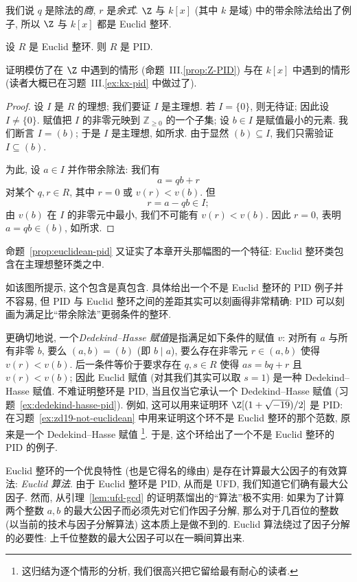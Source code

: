 \noindent 我们说 $q$ 是除法的\emph{商}, $r$ 是\emph{余式}. $\Z$ 与 $k[x]$ (其中 $k$ 是域) 中的带余除法给出了例子, 所以 $\Z$ 与 $k[x]$ 都是 Euclid 整环.

\begin{proposition}\label{prop:euclidean-pid}
设 $R$ 是 Euclid 整环. 则 $R$ 是 PID.
\end{proposition}

\noindent 证明模仿了在 $\Z$ 中遇到的情形 (命题~III.\ref{prop:Z-PID}) 与在 $k[x]$ 中遇到的情形 (读者大概已在习题~III.\ref{ex:kx-pid} 中做过了).

\begin{proof}
设 $I$ 是 $R$ 的理想; 我们要证 $I$ 是主理想. 若 $I=\{0\}$, 则无待证; 因此设 $I\neq\{0\}$. 赋值把 $I$ 的非零元映到 $\mathbb{Z}_{\ge 0}$ 的一个子集; 设 $b\in I$ 是赋值最小的元素. 我们断言 $I=(b)$; 于是 $I$ 是主理想, 如所求. 由于显然 $(b)\subseteq I$, 我们只需验证 $I\subseteq (b)$.

\noindent 为此, 设 $a\in I$ 并作带余除法: 我们有
\[
a = qb + r
\]
对某个 $q,r\in R$, 其中 $r=0$ 或 $v(r)<v(b)$. 但
\[
r = a - qb \in I;
\]
由 $v(b)$ 在 $I$ 的非零元中最小, 我们不可能有 $v(r)<v(b)$. 因此 $r=0$, 表明 $a=qb\in (b)$, 如所求.
\end{proof}

\noindent 命题~\ref{prop:euclidean-pid} 又证实了本章开头那幅图的一个特征: Euclid 整环类包含在主理想整环类之中.

\noindent 如该图所提示, 这个包含是真包含. 具体给出一个不是 Euclid 整环的 PID 例子并不容易, 但 PID 与 Euclid 整环之间的差距其实可以刻画得非常精确: PID 可以刻画为满足比``带余除法''更弱条件的整环.

\noindent 更确切地说, 一个\emph{Dedekind--Hasse 赋值}是指满足如下条件的赋值 $v$: 对所有 $a$ 与所有非零 $b$, 要么 $(a,b)=(b)$ (即 $b\mid a$), 要么存在非零元 $r\in (a,b)$ 使得 $v(r)<v(b)$. 后一条件等价于要求存在 $q,s\in R$ 使得 $as=bq+r$ 且 $v(r)<v(b)$; 因此 Euclid 赋值 (对其我们其实可以取 $s=1$) 是一种 Dedekind--Hasse 赋值. 不难证明整环是 PID, 当且仅当它承认一个 Dedekind--Hasse 赋值 (习题~\ref{ex:dedekind-hasse-pid}). 例如, 这可以用来证明环 $\Z[(1+\sqrt{-19})/2]$ 是 PID: 在习题~\ref{ex:zd19-not-euclidean} 中用来证明这个环不是 Euclid 整环的那个范数, 原来是一个 Dedekind--Hasse 赋值%
\footnote{这归结为逐个情形的分析, 我们很高兴把它留给最有耐心的读者.}. 于是, 这个环给出了一个不是 Euclid 整环的 PID 的例子.

\noindent Euclid 整环的一个优良特性 (也是它得名的缘由) 是存在计算最大公因子的有效算法: \emph{Euclid 算法}. 由于 Euclid 整环是 PID, 从而是 UFD, 我们知道它们确有最大公因子. 然而, 从引理~\ref{lem:ufd-gcd} 的证明蒸馏出的``算法''极不实用: 如果为了计算两个整数 $a,b$ 的最大公因子而必须先对它们作因子分解, 那么对于几百位的整数 (以当前的技术与因子分解算法) 这本质上是做不到的. Euclid 算法绕过了因子分解的必要性: 上千位整数的最大公因子可以在一瞬间算出来.

